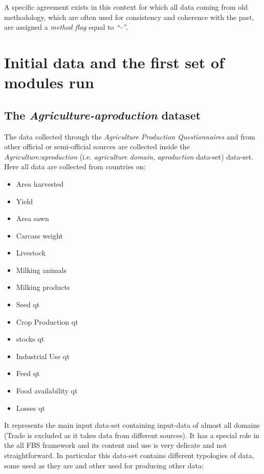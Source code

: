 \documentclass[]{article}
\providecommand{\tightlist}{%
  \setlength{\itemsep}{0pt}\setlength{\parskip}{0pt}}
\begin{document}
A specific agreement exists in this context for which all data coming
from old methodology, which are often used for consistency and coherence
with the past, are assigned a \emph{method flag} equal to \emph{``-''}.

\section{Initial data and the first set of modules
run}\label{initial-data-and-the-first-set-of-modules-run}

\subsection{\texorpdfstring{The \emph{Agriculture-aproduction}
dataset}{The Agriculture-aproduction dataset}}\label{the-agriculture-aproduction-dataset}

The data collected through the \emph{Agriculture Production
Questionnaires} and from other official or semi-official sources are
collected inside the \emph{Agriculture:aproduction} (i.e.
\emph{agriculture domain}, \emph{aproduction} data-set) data-set. Here
all data are collected from countries on:

\begin{itemize}
\tightlist
\item
  Area harvested
\item
  Yield
\item
  Area sawn
\item
  Carcass weight
\item
  Livestock
\item
  Milking animals
\item
  Milking products
\item
  Seed qt
\item
  Crop Production qt
\item
  stocks qt
\item
  Industrial Use qt
\item
  Feed qt
\item
  Food availability qt
\item
  Losses qt
\end{itemize}

It represents the main input data-set containing input-data of almost
all domains (Trade is excluded as it takes data from different sources).
It has a special role in the all FBS framework and its content and use
is very delicate and not straightforward. In particular this data-set
contains different typologies of data, some used as they are and other
used for producing other data:
\end{document}
